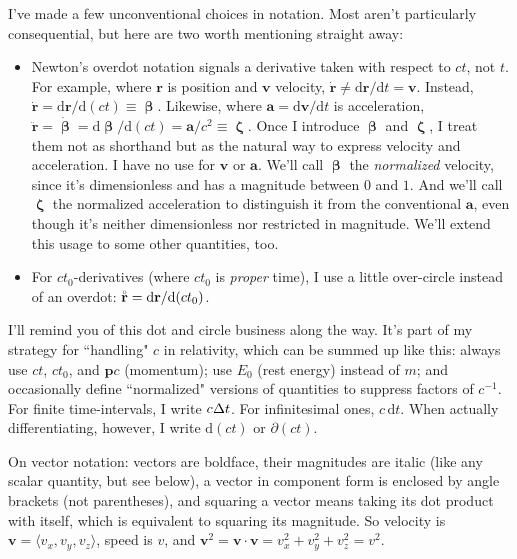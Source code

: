\documentclass[12pt]{article}
\renewcommand{\mathring}[1]{\accentset{\circ}{#1}}
\renewcommand{\vv}[1]{\mathbf{#1}}
\newcommand{\dd}[1]{\mathrm{d}#1}
\newcommand{\vvbeta}{\bm{\upbeta}}
\newcommand{\vvzeta}{\bm{\upzeta}}
\begin{document}
I've made a few unconventional choices in notation. Most aren't particularly consequential, but here are two worth mentioning straight away:
\begin{itemize}
\item Newton's overdot notation signals a derivative taken with respect to $ct$, not $t$. For example, where $\vv r$ is position and $\vv v$ velocity, ${\dot{\vv r} \neq \dd \vv r / \dd t = \vv v}$. Instead, $\dot{\vv r} = \dd \vv r / \dd (ct) \equiv \vvbeta$. Likewise, where $\vv a = \dd \vv v / \dd t$ is acceleration, $\ddot{\vv r} = \dot{\vvbeta} = \dd \vvbeta / \dd (ct) = \vv a / c^2 \equiv \vvzeta$. Once I introduce $\vvbeta$ and $\vvzeta$, I treat them not as shorthand but as the natural way to express velocity and acceleration. I have no use for $\vv v$ or $\vv a$. We'll call $\vvbeta$ the \emph{normalized} velocity, since it's dimensionless and has a magnitude between $0$ and $1$. And we'll call $\vvzeta$ the normalized acceleration to distinguish it from the conventional $\vv a$, even though it's neither dimensionless nor restricted in magnitude. We'll extend this usage to some other quantities, too.
\item For $c t_0$-derivatives (where $ct_0$ is \emph{proper} time), I use a little over-circle instead of an overdot: $\mathring{\vv r} = \dd \vv r / \dd (c t_0)$.
\end{itemize}
I'll remind you of this dot and circle business along the way. It's part of my strategy for ``handling" $c$ in relativity, which can be summed up like this: always use $ct$, $ct_0$, and $\vv p c$ (momentum); use $E_0$ (rest energy) instead of $m$; and occasionally define ``normalized" versions of quantities to suppress factors of $c^{-1}$. For finite time-intervals, I write $c \mkern.5mu \Delta t$. For infinitesimal ones, $c \, \dd t$. When actually differentiating, however, I write $\dd (ct)$ or $\partial(ct)$.

On vector notation: vectors are boldface, their magnitudes are italic (like any scalar quantity, but see below), a vector in component form is enclosed by angle brackets (not parentheses), and squaring a vector means taking its dot product with itself, which is equivalent to squaring its magnitude. So velocity is $\vv v = \langle v_x, v_y, v_z \rangle$, speed is $v$, and $\vv v^2 = \vv v \cdot \vv v = v_x^2 + v_y^2 + v_z^2 = v^2$.
\end{document}
